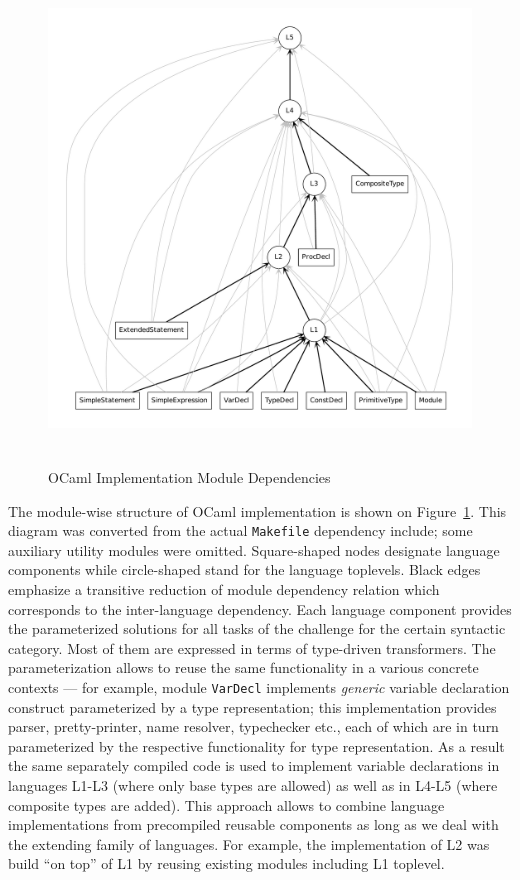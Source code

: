 \begin{figure}
\begin{center}
\includegraphics[height=13cm, width=14cm]{ocaml/depend.pdf}
\end{center}
\caption{OCaml Implementation Module Dependencies}
\label{ocamlmoddep}
\end{figure}

The module-wise structure of OCaml implementation is shown on Figure~\ref{ocamlmoddep}. This diagram
was converted from the actual \verb|Makefile| dependency include; some auxiliary utility modules were
omitted. Square-shaped nodes designate language components while circle-shaped stand for the 
language toplevels. Black edges emphasize a transitive reduction of module dependency relation which corresponds 
to the inter-language dependency. Each language component provides the parameterized solutions for all
tasks of the challenge for the certain syntactic category. Most of them are expressed in terms of
type-driven transformers. The parameterization allows to reuse the same functionality in a various
concrete contexts --- for example, module \verb|VarDecl| implements \emph{generic} variable declaration
construct parameterized by a type representation; this implementation provides parser, pretty-printer, name resolver,
typechecker etc., each of which are in turn parameterized by the respective functionality for type representation.
As a result the same separately compiled code is used to implement variable declarations in languages
L1-L3 (where only base types are allowed) as well as in L4-L5 (where composite types are added). This approach
allows to combine language implementations from precompiled reusable components as long as we deal with the extending
family of languages. For example, the implementation of L2 was build ``on top'' of L1 by reusing existing modules 
including L1 toplevel.


